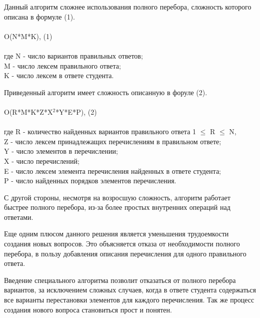 \documentclass[a4paper,english,russian]{G2-105}
\begin{document}
\par Данный алгоритм сложнее использования полного перебора, сложность которого описана в формуле (1).
\\ \hfill \\
\hspace*{66mm}    O(N*M*K),  \hspace*{62mm} (1) \\
\hfill \\ 
где N - число вариантов правильных ответов; \\
\hspace*{8 mm}M - число лексем правильного ответа; \\
\hspace*{8 mm}K - число лексем в ответе студента. 
\par Приведенный алгоритм имеет сложность описанную в форуле (2). \\ 
\hfill \\
\hspace*{51mm} O(R*M*K*Z*X$^2$*Y*E*P), \hspace*{44mm}(2) \\
\hfill \\
где R - количество найденных вариантов правильного ответа 1 $\leq$ R $\leq$  N, \\
\hspace*{8 mm}Z - число лексем принадлежащих перечислениям в правильном ответе;\\
\hspace*{8 mm}Y - число элементов в перечислении;\\
\hspace*{8 mm}X - число перечислений; \\
\hspace*{8 mm}E - число лексем элемента перечисления найденных в ответе студента; \\
\hspace*{8 mm}P - число найденных порядков элементов перечисления.
\par С другой стороны, несмотря на возросшую сложность, алгоритм работает быстрее полного перебора, из-за более простых внутренних операций над ответами.
\par Еще одним плюсом данного решения является уменьшения трудоемкости создания новых вопросов. Это объясняется отказа от необходимости полного перебора, в пользу добавления описания перечисления для одного правильного ответа.


\par Введение специального алгоритма позволит отказаться от полного перебора вариантов, за исключением сложных случаев, когда в ответе студента содержаться все варианты перестановки элементов для каждого перечисления. Так же процесс создания нового вопроса становиться прост и понятен. 
\end{document}
